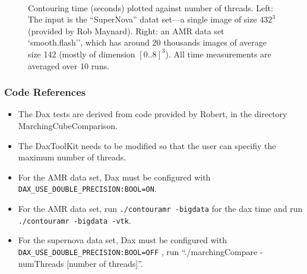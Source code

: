 \documentclass{article}
\begin{document}
\begin{figure}[H]
\centering \mbox{
  \quad {}
}
\caption{ Contouring time (seconds) plotted against number of
  threads. Left: The input is the ``SuperNova'' datat set---a single
  image of size $432^3$ (provided by Rob Maynard). Right: an AMR data
  set `smooth.flash'', which has around 20 thousands images of
  average size 142 (mostly of dimension $[0..8]^3$). All time
  measurements are averaged over 10 runs.}
\label{fig:dax-vtk}
\end{figure}


\subsubsection*{Code References}
\begin{itemize}
\item The Dax tests are derived from code provided by Robert, in the directory MarchingCubeComparison.
\item The DaxToolKit needs to be modified so that the user can specifiy the maximum number of threads.
\item For the AMR data set, Dax must be configured with {\tt DAX\_USE\_DOUBLE\_PRECISION:BOOL=ON}.
\item For the AMR data set, run {\tt ./contouramr -bigdata} for the dax time and run {\tt ./contouramr -bigdata -vtk}.
\item For the supernova data set, Dax must be configured with {\tt DAX\_USE\_DOUBLE\_PRECISION:BOOL=OFF}
, run ``./marchingCompare -numThreads [number of threads]''.
\end{itemize}
\end{document}
